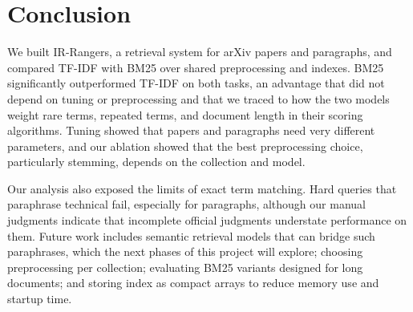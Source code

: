 \documentclass[sigconf,nonacm]{acmart}
\begin{document}
\section{Conclusion}
We built IR-Rangers, a retrieval system for arXiv papers and paragraphs, and compared TF-IDF 
with BM25 over shared preprocessing and indexes. BM25 significantly outperformed TF-IDF on 
both tasks, an advantage that did not depend on tuning or preprocessing and that we traced 
to how the two models weight rare terms, repeated terms, and document length in their 
scoring algorithms. Tuning showed that papers and paragraphs need very different parameters, 
and our ablation showed that the best preprocessing choice, particularly stemming, depends on the 
collection and model.

Our analysis also exposed the limits of exact term matching. Hard queries that paraphrase technical 
fail, especially for paragraphs, although our manual judgments indicate that incomplete official 
judgments understate performance on them. Future work includes semantic retrieval models that 
can bridge such paraphrases, which the next phases of this project will explore; choosing preprocessing 
per collection; evaluating BM25 variants designed for long documents; and storing index as compact 
arrays to reduce memory use and startup time.



\end{document}
